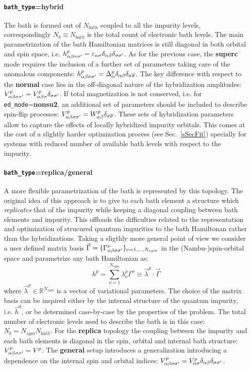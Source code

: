 \documentclass[preprint,3p,10pt]{elsarticle}
\newcommand{\secu}[1]
{Sec.~\ref{#1}}
\def\a{\alpha}       \def\b{\beta}   \def\g{\gamma}   \def\d{\delta}
\def\RRR{\mathbb{R}} \def\CCC{\mathbb{C}} \def\NNN{\mathbb{N}}
\begin{document}
\paragraph{{\tt bath\_type}={\bf hybrid}} The bath is formed out of
$N_{bath}$ coupled to all the impurity levels, correspondingly
$N_b\equiv N_{bath}$ is the total count of electronic bath levels. 
The main parametrization of the bath Hamiltonian matrices is still
diagonal in both orbital and spin space, i.e.
$h^p_{\a\b\s\s'}=\varepsilon_{\a\s}\delta_{\a\b}\delta_{\s\s'}$.
As for the previous case, the {\bf superc} mode requires the inclusion
of a further set of parameters taking care of the anomalous components:
$h^p_{\a\b\s\s'}=\Delta^p_{\a}\delta_{\a\b}\delta_{\s
  \overline{\s}}$.
The key difference with respect to the {\bf normal} case lies in the
off-diagonal nature of the hybridization amplitudes:
$V^p_{\a\b\s\s'}=V^p_{\a\b\s}\delta_{\s\s'}$. If total magnetization
is not conserved, i.e. for {\tt ed\_mode}={\bf nonsu2}, an additional
set of parameters should be included to describe spin-flip processes:
$V^p_{\a\b\s\s'} = W^p_{\a\b}\delta_{\s \overline{\s}}$. 
These sets of hybridization parameters allow to capture the effects of locally
hybridized impurity orbitals. This comes at the cost of a
slightly harder optimization process (see \secu{sSecFit}) specially
for systems with reduced number of available bath levels with respect
to the impurity. 

\paragraph{{\tt bath\_type}={\bf replica}/{\bf general}} A more flexible
parametrization of the bath is represented by this topology. The
original idea of this approach is to give to each bath element a structure which {\it replicates}
that of the impurity while keeping a diagonal coupling between bath
elements and impurity. This offloads the difficulties related to the
representation and optimization of strucured quantum impurities to the
bath Hamiltonan rather than the hybridizations.
Taking a sligthly more general point of view we consider a user
defined matrix basis $\vec{\Gamma}=\{ \Gamma^\nu_{\a\b\s\s'} \}_{\nu=1,\dots,N_{sym}}$ in the (Nambu-)spin-orbital
space and parametrize any bath Hamiltonian as:
$$
h^p = \sum_{\nu=1}^{N_{sym}} \lambda^p_\nu
\Gamma^\nu\equiv \vec{\lambda}^p\cdot \vec{\Gamma}
$$
where $\vec{\lambda}^p\in\RRR^{N_{sym}}$ is a vector of variational parameters. 
The choice of the matrix basis can be inspired either by the internal structure
of the quantum impurity, i.e. $\hat{h}^0$, or be determined
case-by-case by the properties of the problem.
The total number of electronic levels used to describe the bath is in
this case: $N_b = N_{sym} N_{bath}$. 
For the {\bf replica}  topology the coupling between the impurity and
each bath elements is diagonal in the spin, orbital and internal bath
structure: $V^p_{\a\b\s\s'} = V^p$. The
{\bf general} setup introduces a generalization introducing a
dependence on the internal spin and orbital indices: $V^p_{\a\b\s\s'}
= V^p_{\a\s}\delta_{\a\b}\delta_{\s\s'}$. 
\end{document}
